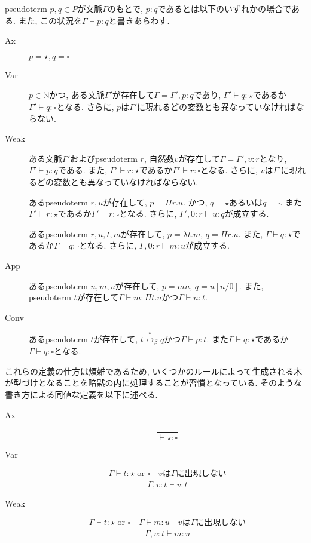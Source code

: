 \documentclass{ltjsarticle}
\begin{document}
\begin{defn}
 pseudoterm $p, q \in P$が文脈$\Gamma$のもとで, $p : q$であるとは以下のいずれかの場合である.
 また, この状況を$\Gamma \vdash p : q$と書きあらわす.
 \begin{description}
  \item[Ax] $p = {\star}, q = {\square}$
  \item[Var] $p \in \mathbb{N}$かつ, ある文脈$\Gamma'$が存在して$\Gamma = \Gamma', p : q$であり, $\Gamma' \vdash q : \star$であるか$\Gamma' \vdash q : \square$となる. さらに, $p$は$\Gamma'$に現れるどの変数とも異なっていなければならない.
  \item[Weak] ある文脈$\Gamma'$およびpseudoterm $r$, 自然数$v$が存在して$\Gamma = \Gamma', v : r$となり, $\Gamma' \vdash p : q$である. また, $\Gamma' \vdash r : \star$であるか$\Gamma' \vdash r : \square$となる. さらに, $v$は$\Gamma'$に現れるどの変数とも異なっていなければならない.
  \item[\Pi] あるpseudoterm $r, u$が存在して, $p = \Pi r. u$. かつ, $q = \star$あるいは$q = \square$. また$\Gamma' \vdash r : \star$であるか$\Gamma' \vdash r : \square$となる. さらに, $\Gamma', 0 : r \vdash u : q$が成立する.
  \item[\lambda] あるpseudoterm $r, u, t, m$が存在して, $p = \lambda t. m$, $q = \Pi r. u$. また, $\Gamma \vdash q : \star$であるか$\Gamma \vdash q : \square$となる. さらに, $\Gamma, 0 : r \vdash m : u$が成立する.
  \item[App] あるpseudoterm $n, m, u$が存在して, $p = m n$, $q = u[n/0]$. また, pseudoterm $t$が存在して$\Gamma \vdash m : \Pi t. u$かつ$\Gamma \vdash n : t$.
  \item[Conv] あるpseudoterm $t$が存在して, $t \overset{*}{\leftrightarrow}_\beta q$かつ$\Gamma \vdash p : t$. また$\Gamma \vdash q : \star$であるか$\Gamma \vdash q : \square$となる.
 \end{description}
 これらの定義の仕方は煩雑であるため, いくつかのルールによって生成される木が型づけとなることを暗黙の内に処理することが習慣となっている. そのような書き方による同値な定義を以下に述べる.
 \begin{description}
  \item[Ax] \[ \frac{}{\vdash {\star} {\colon} {\square}} \]
  \item[Var] \[ \frac{\Gamma \vdash t {\colon} {\star} \text{ or } {\square} \quad \text{$v$は$\Gamma$に出現しない}}{\Gamma, v {\colon} t \vdash v {\colon} t} \]
  \item[Weak] \[ \frac{\Gamma \vdash t {\colon} {\star} \text{ or } \square \quad \Gamma \vdash m {\colon} u \quad \text{$v$は$\Gamma$に出現しない}}{\Gamma, v {\colon} t \vdash m {\colon} u} \]

\end{description}
\end{defn}
\end{document}
